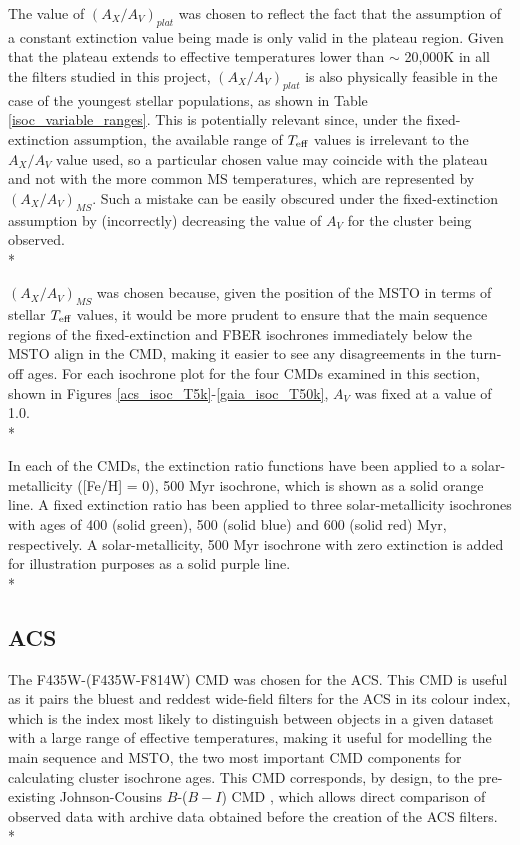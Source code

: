 \documentclass[12pt, a4paper]{report}
\begin{document}
The value of $(A_{X}/A_{V})_{plat}$ was chosen to reflect the fact that the assumption of a constant extinction value being made is only valid in the plateau region. Given that the plateau extends to effective temperatures lower than $\sim$ 20,000K in all the filters studied in this project, $(A_{X}/A_{V})_{plat}$ is also physically feasible in the case of the youngest stellar populations, as shown in Table \ref{isoc_variable_ranges}. This is potentially relevant since, under the fixed-extinction assumption, the available range of $T_{\textnormal{eff}}$ values is irrelevant to the $A_{X}/A_{V}$ value used, so a particular chosen value may coincide with the plateau and not with the more common MS temperatures, which are represented by $(A_{X}/A_{V})_{MS}$. Such a mistake can be easily obscured under the fixed-extinction assumption by (incorrectly) decreasing the value of $A_{V}$ for the cluster being observed.\\*

$(A_{X}/A_{V})_{MS}$ was chosen because, given the position of the MSTO in terms of stellar $T_{\textnormal{eff}}$ values, it would be more prudent to ensure that the main sequence regions of the fixed-extinction and FBER isochrones immediately below the MSTO align in the CMD, making it easier to see any disagreements in the turn-off ages. For each isochrone plot for the four CMDs examined in this section, shown in Figures \ref{acs_isoc_T5k}-\ref{gaia_isoc_T50k}, $A_{V}$ was fixed at a value of 1.0.\\*

In each of the CMDs, the extinction ratio functions have been applied to a solar-metallicity ([Fe/H] = 0), 500 Myr isochrone, which is shown as a solid orange line. A fixed extinction ratio has been applied to three solar-metallicity isochrones with ages of 400 (solid green), 500 (solid blue) and 600 (solid red) Myr, respectively. A solar-metallicity, 500 Myr isochrone with zero extinction is added for illustration purposes as a solid purple line.\\*

\subsection{ACS} \label{ACS_isoc}
The F435W-(F435W-F814W) CMD was chosen for the ACS. This CMD is useful as it pairs the bluest and reddest wide-field filters for the ACS in its colour index, which is the index most likely to distinguish between objects in a given dataset with a large range of effective temperatures, making it useful for modelling the main sequence and MSTO, the two most important CMD components for calculating cluster isochrone ages. This CMD corresponds, by design, to the pre-existing Johnson-Cousins $B$-($B-I$) CMD \citep{2005PASP..117.1049S}, which allows direct comparison of observed data with archive data obtained before the creation of the ACS filters.\\*
\end{document}
